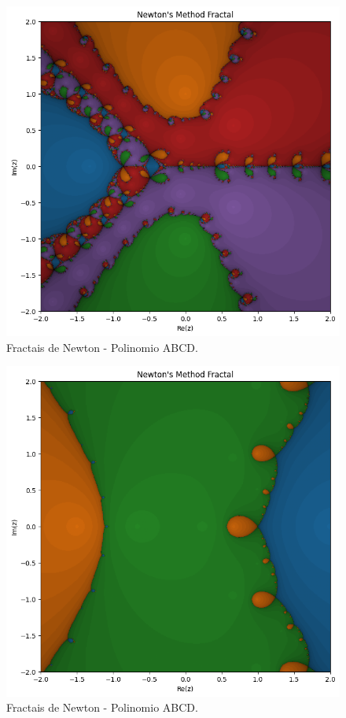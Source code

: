 \begin{figure}[H]
    \centering
    \includegraphics[width=1\textwidth]{Imagens/nr2d_fractals/polinomials/nrfractal_polinomio2.png}
    \caption{Fractais de Newton - Polinomio ABCD.}
    \label{fig:fractaisnr_polinomials1}
\end{figure}

\begin{figure}[H]
    \centering
    \includegraphics[width=1\textwidth]{Imagens/nr2d_fractals/polinomials/nrfractal_polinomio3.png}
    \caption{Fractais de Newton - Polinomio ABCD.}
    \label{fig:fractaisnr_polinomials1}
\end{figure}


